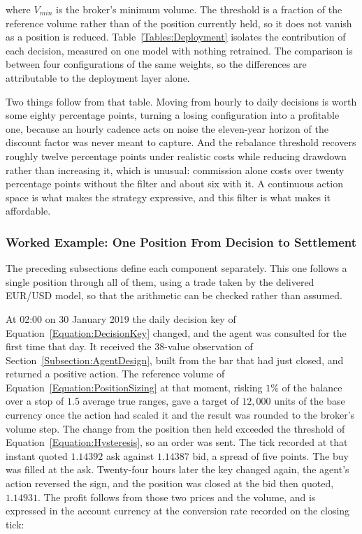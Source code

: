 where $V_{min}$ is the broker's minimum volume. The threshold is a fraction of the reference volume rather than of the position currently held, so it does not vanish as a position is reduced. Table~\ref{Tables:Deployment} isolates the contribution of each decision, measured on one model with nothing retrained. The comparison is between four configurations of the same weights, so the differences are attributable to the deployment layer alone.



Two things follow from that table. Moving from hourly to daily decisions is worth some eighty percentage points, turning a losing configuration into a profitable one, because an hourly cadence acts on noise the eleven-year horizon of the discount factor was never meant to capture. And the rebalance threshold recovers roughly twelve percentage points under realistic costs while reducing drawdown rather than increasing it, which is unusual: commission alone costs over twenty percentage points without the filter and about six with it. A continuous action space is what makes the strategy expressive, and this filter is what makes it affordable.

\subsubsection{Worked Example: One Position From Decision to Settlement}

The preceding subsections define each component separately. This one follows a single position through all of them, using a trade taken by the delivered EUR/USD model, so that the arithmetic can be checked rather than assumed.

At 02:00 on 30 January 2019 the daily decision key of Equation~\ref{Equation:DecisionKey} changed, and the agent was consulted for the first time that day. It received the 38-value observation of Section~\ref{Subsection:AgentDesign}, built from the bar that had just closed, and returned a positive action. The reference volume of Equation~\ref{Equation:PositionSizing} at that moment, risking $1\%$ of the balance over a stop of $1.5$ average true ranges, gave a target of $12{,}000$ units of the base currency once the action had scaled it and the result was rounded to the broker's volume step. The change from the position then held exceeded the threshold of Equation~\ref{Equation:Hysteresis}, so an order was sent. The tick recorded at that instant quoted $1.14392$ ask against $1.14387$ bid, a spread of five points. The buy was filled at the ask. Twenty-four hours later the key changed again, the agent's action reversed the sign, and the position was closed at the bid then quoted, $1.14931$. The profit follows from those two prices and the volume, and is expressed in the account currency at the conversion rate recorded on the closing tick:


